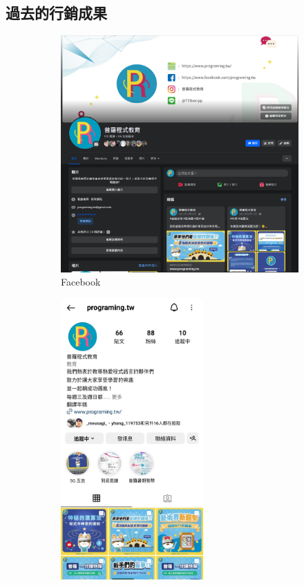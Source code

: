 \subsection{過去的行銷成果}
\label{fig:Appendix-Marketing}
\begin{figure}[H]
	\centering
	\begin{subfigure}{0.32\linewidth}
		\centering
		\includegraphics[width=1\textwidth]{images/FB.png}
		\caption{Facebook}
		\label{fig:FB}
	\end{subfigure}
	\begin{subfigure}{0.32\linewidth}
		\centering
		\includegraphics[width=0.6\textwidth]{images/IG.jpg}

\end{subfigure}
\end{figure}
